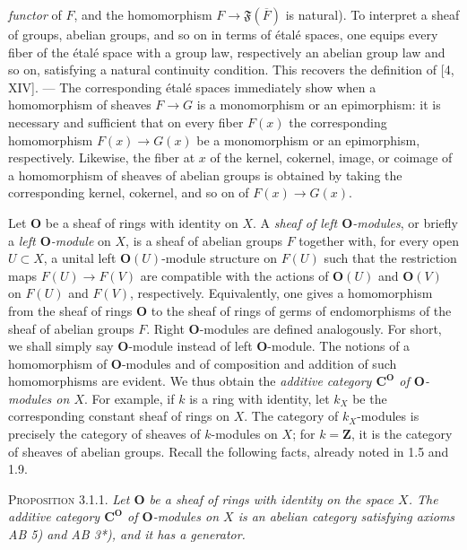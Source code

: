 
\noindent \textit{functor} of $F$, and the homomorphism
$F\to\mathfrak F(\overline F)$ is natural). To interpret a sheaf
of groups, abelian groups, and so on in terms of étalé spaces, one equips
every fiber of the étalé space with a group law, respectively an abelian
group law and so on, satisfying a natural continuity condition. This recovers
the definition of [4, XIV].
--- The corresponding étalé spaces immediately show when a homomorphism of
sheaves $F\to G$ is a monomorphism or an epimorphism: it is
necessary and sufficient that on every fiber $F(x)$ the corresponding
homomorphism $F(x)\to G(x)$ be a monomorphism or an epimorphism,
respectively. Likewise, the fiber at $x$ of the kernel, cokernel, image, or
coimage of a homomorphism of sheaves of abelian groups is obtained by taking
the corresponding kernel, cokernel, and so on of
$F(x)\to G(x)$.

Let $\mathbf O$ be a sheaf of rings with identity on $X$. A
\textit{sheaf of left $\mathbf O$-modules}, or briefly a \textit{left
$\mathbf O$-module} on $X$, is a sheaf of abelian groups $F$ together with,
for every open $U\subset X$, a unital left $\mathbf O(U)$-module structure on
$F(U)$ such that the restriction maps $F(U)\to F(V)$ are
compatible with the actions of $\mathbf O(U)$ and $\mathbf O(V)$ on $F(U)$
and $F(V)$, respectively. Equivalently, one gives a homomorphism from the
sheaf of rings $\mathbf O$ to the sheaf of rings of germs of endomorphisms of
the sheaf of abelian groups $F$.
Right $\mathbf O$-modules are defined analogously. For short, we shall simply
say $\mathbf O$-module instead of left $\mathbf O$-module. The notions of a
homomorphism of $\mathbf O$-modules and of composition and addition of such
homomorphisms are evident. We thus obtain the \textit{additive category
$\mathbf C^{\mathbf O}$ of $\mathbf O$-modules on $X$}. For example, if $k$ is a ring
with identity, let $k_X$ be the corresponding constant sheaf of rings on
$X$. The category of $k_X$-modules is precisely the category of sheaves of
$k$-modules on $X$; for $k=\mathbf Z$, it is the category of sheaves of
abelian groups. Recall the following facts, already noted in 1.5 and 1.9.

\textsc{Proposition 3.1.1.} \textit{Let $\mathbf O$ be a sheaf of rings
with identity on the space $X$. The additive category $\mathbf C^{\mathbf O}$ of
$\mathbf O$-modules on $X$ is an abelian category satisfying axioms \textup{AB 5)} and
\textup{AB 3*)}, and it has a generator.}

